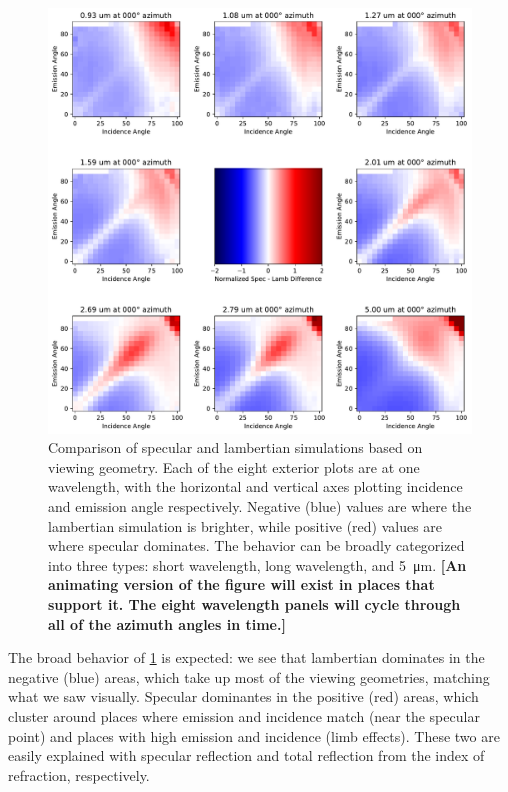 \documentclass{article}
\begin{document}
\begin{figure}[htbp]
\includegraphics[scale = 0.44]{SpecLambNormDiff.pdf}
\centering
\caption{Comparison of specular and lambertian simulations based on viewing geometry. Each of the eight exterior plots are at one wavelength, with the horizontal and vertical axes plotting incidence and emission angle respectively. Negative (blue) values are where the lambertian simulation is brighter, while positive (red) values are where specular dominates. The behavior can be broadly categorized into three types: short wavelength, long wavelength, and \qty{5}{\micro\meter}. \textbf{\color{red} [An animating version of the figure will exist in places that support it. The eight wavelength panels will cycle through all of the azimuth angles in time.] \color{black}}}
\label{fig:10}
\end{figure}

The broad behavior of \ref{fig:10} is expected: we see that lambertian dominates in the negative (blue) areas, which take up most of the viewing geometries, matching what we saw visually. Specular dominantes in the positive (red) areas, which cluster around places where emission and incidence match (near the specular point) and places with high emission and incidence (limb effects). These two are easily explained with specular reflection and total reflection from the index of refraction, respectively.
\end{document}
